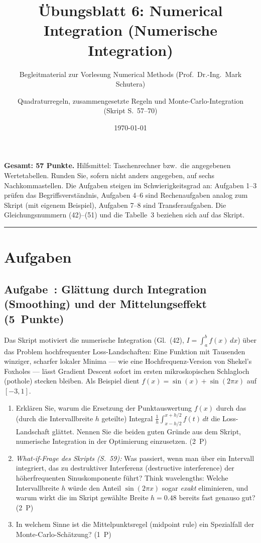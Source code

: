 \documentclass[a4paper,11pt]{scrartcl}
\title{Übungsblatt 6: Numerical Integration (Numerische Integration)}
\subtitle{Begleitmaterial zur Vorlesung \glqq Numerical Methods\grqq{} (Prof.\ Dr.-Ing.\ Mark Schutera)}
\author{Quadraturregeln, zusammengesetzte Regeln und Monte-Carlo-Integration\\(Skript S.~57--70)}
\date{\today}
\newcounter{aufgabe}
\newcommand{\Aufgabe}[2]{%
  \refstepcounter{aufgabe}%
  \subsection*{Aufgabe~\theaufgabe: #1 \hfill (#2~Punkte)}%
  \label{auf:\theaufgabe}}
\begin{document}
\maketitle

\noindent\textbf{Gesamt: 57 Punkte.}\quad
Hilfsmittel: Taschenrechner bzw.\ die angegebenen Wertetabellen. Runden Sie, sofern nicht anders angegeben, auf sechs Nachkommastellen. Die Aufgaben steigen im Schwierigkeitsgrad an: Aufgaben 1--3 prüfen das Begriffsverständnis, Aufgaben 4--6 sind Rechenaufgaben analog zum Skript (mit eigenem Beispiel), Aufgaben 7--8 sind Transferaufgaben. Die Gleichungsnummern (42)--(51) und die Tabelle~3 beziehen sich auf das Skript.

\bigskip
\hrule

\section*{Aufgaben}

\Aufgabe{Glättung durch Integration (Smoothing) und der Mittelungseffekt}{5}

Das Skript motiviert die numerische Integration (Gl.~(42), $I = \int_a^b f(x)\,dx$) über das Problem hochfrequenter Loss-Landschaften: Eine Funktion mit Tausenden winziger, scharfer lokaler Minima --- wie eine Hochfrequenz-Version von Shekel's Foxholes --- lässt Gradient Descent sofort im ersten mikroskopischen \glqq Schlagloch\grqq{} (pothole) stecken bleiben. Als Beispiel dient $f(x) = \sin(x) + \sin(2\pi x)$ auf $[-3, 1]$.

\begin{enumerate}[label=(\alph*)]
  \item Erklären Sie, warum die Ersetzung der Punktauswertung $f(x)$ durch das (durch die Intervallbreite $h$ geteilte) Integral $\frac{1}{h}\int_{x-h/2}^{x+h/2} f(t)\,dt$ die Loss-Landschaft glättet. Nennen Sie die beiden \glqq guten Gründe\grqq{} aus dem Skript, numerische Integration in der Optimierung einzusetzen. \hfill (2~P)
  \item \emph{What-if-Frage des Skripts (S.~59):} Was passiert, wenn man über ein Intervall integriert, das zu destruktiver Interferenz (destructive interference) der höherfrequenten Sinuskomponente führt? \glqq Think wavelengths\grqq: Welche Intervallbreite $h$ würde den Anteil $\sin(2\pi x)$ sogar \emph{exakt} eliminieren, und warum wirkt die im Skript gewählte Breite $h = 0.48$ bereits fast genauso gut? \hfill (2~P)
  \item In welchem Sinne ist die Mittelpunktsregel (midpoint rule) ein Spezialfall der Monte-Carlo-Schätzung? \hfill (1~P)
\end{enumerate}
\end{document}
